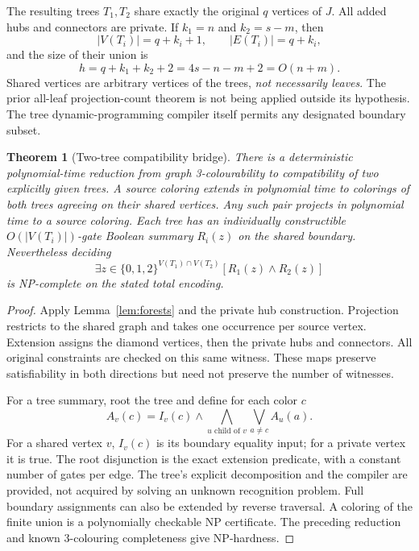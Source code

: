 \documentclass[11pt]{article}
\newtheorem{theorem}{Theorem}
\newcommand{\Col}{\{0,1,2\}}
\begin{document}
The resulting trees $T_1,T_2$ share exactly the original $q$ vertices of
$J$. All added hubs and connectors are private. If $k_1=n$ and $k_2=s-m$,
then
\[
 |V(T_i)|=q+k_i+1,\qquad |E(T_i)|=q+k_i,
\]
and the size of their union is
\[
 h=q+k_1+k_2+2=4s-n-m+2=O(n+m).
\]
Shared vertices are arbitrary vertices of the trees, \emph{not necessarily
leaves}. The prior all-leaf projection-count theorem is not being applied
outside its hypothesis. The tree dynamic-programming compiler itself permits
any designated boundary subset.

\begin{theorem}[Two-tree compatibility bridge]\label{thm:twotree}
There is a deterministic polynomial-time reduction from graph 3-colourability
to compatibility of two explicitly given trees. A source coloring extends
in polynomial time to colorings of both trees agreeing on their shared
vertices. Any such pair projects in polynomial time to a source coloring.
Each tree has an individually constructible $O(|V(T_i)|)$-gate Boolean
summary $R_i(z)$ on the shared boundary. Nevertheless deciding
\[
 \exists z\in\Col^{V(T_1)\cap V(T_2)}
             [R_1(z)\land R_2(z)]
\]
is NP-complete on the stated total encoding.
\end{theorem}
\begin{proof}
Apply Lemma~\ref{lem:forests} and the private hub construction. Projection
restricts to the shared graph and takes one occurrence per source vertex.
Extension assigns the diamond vertices, then the private hubs and connectors.
All original constraints are checked on this same witness. These maps preserve
satisfiability in both directions but need not preserve the number of witnesses.

For a tree summary, root the tree and define for each color $c$
\[
 A_v(c)=I_v(c)\land\bigwedge_{u\text{ child of }v}
                           \bigvee_{a\ne c}A_u(a).
\]
For a shared vertex $v$, $I_v(c)$ is its boundary equality input; for a private
vertex it is true. The root disjunction is the exact extension predicate,
with a constant number of gates per edge. The tree's explicit decomposition
and the compiler are provided, not acquired by solving an unknown recognition
problem. Full boundary assignments can also be extended by reverse traversal.
A coloring of the finite union is a polynomially checkable NP certificate.
The preceding reduction and known 3-colouring completeness give NP-hardness.
\end{proof}
\end{document}
